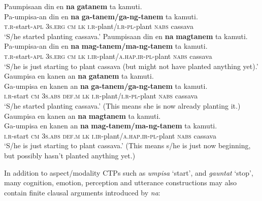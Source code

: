 \ea
Paumpisaan  din  en  \textbf{na}  \textbf{gatanem}  ta  kamuti. \smallskip\\
\gll Pa-umpisa-an  din  en  \textbf{na}  \textbf{ga-tanem/ga-ng-tanem}  ta  kamuti. \\
\textsc{t.r}-start-\textsc{apl}  3\textsc{s.erg}  \textsc{cm}  \textsc{lk}  \textsc{i.r}-plant/\textsc{i.r}-\textsc{pl}-plant  \textsc{nabs}  cassava \\
\glt ‘S/he started planting cassava.’
\z
\ea
Paumpisaan  din  en  \textbf{na}  \textbf{magtanem}  ta  kamuti. \smallskip\\
\gll Pa-umpisa-an  din  en  \textbf{na}  \textbf{mag-tanem/ma-ng-tanem}  ta  kamuti. \\
\textsc{t.r}-start-\textsc{apl}  3\textsc{s.erg}  \textsc{cm}  \textsc{lk}  \textsc{i.ir}-plant\textsc{/a.hap.ir}-\textsc{pl}-plant  \textsc{nabs}  cassava \\
\glt ‘S/he is just starting to plant cassava (but might not have planted anything yet).’
\z
\ea
Gaumpisa  en  kanen  an  \textbf{na}  \textbf{gatanem}  ta  kamuti. \smallskip\\
\gll Ga-umpisa  en  kanen  an  \textbf{na}  \textbf{ga-tanem/ga-ng-tanem}  ta  kamuti. \\
\textsc{i.r}-start  \textsc{cm}  3\textsc{s.abs}  \textsc{def.m}  \textsc{lk}  \textsc{i.r}-plant\textsc{/i.r}-\textsc{pl}-plant  \textsc{nabs}  cassava \\
\glt ‘S/he started planting cassava.’ (This means she is now already planting it.)
\z
\ea
Gaumpisa  en  kanen  an  \textbf{na}  \textbf{magtanem}  ta  kamuti. \smallskip\\
\gll Ga-umpisa  en  kanen  an  \textbf{na}  \textbf{mag-tanem/ma-ng-tanem}  ta  kamuti. \\
\textsc{i.r}-start  \textsc{cm}  3\textsc{s.abs}  \textsc{def.m}  \textsc{lk}  \textsc{i.ir}-plant\textsc{/a.hap.ir}-\textsc{pl}-plant  \textsc{nabs}  cassava \\
\glt ‘S/he is just starting to plant cassava.’ (This means s/he is just now beginning, but possibly hasn’t planted anything yet.)
\z

In addition to aspect/modality CTPs such as \textit{umpisa} ‘start’,  and \textit{gauntat} ‘stop’, many cognition, emotion, perception and utterance constructions may also contain finite clausal arguments introduced by \textit{na}:

